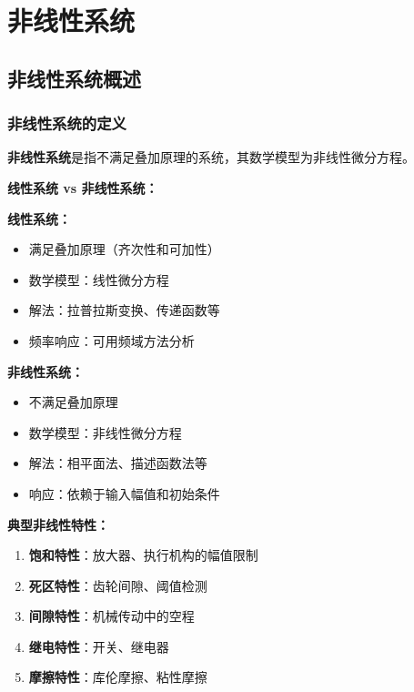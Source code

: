 \section{非线性系统}

\subsection{非线性系统概述}

\subsubsection{非线性系统的定义}

\textbf{非线性系统}是指不满足叠加原理的系统，其数学模型为非线性微分方程。

\begin{minipage}[t]{0.48\textwidth}
\textbf{线性系统 vs 非线性系统：}

\textbf{线性系统：}
\begin{itemize}
    \item 满足叠加原理（齐次性和可加性）
    \item 数学模型：线性微分方程
    \item 解法：拉普拉斯变换、传递函数等
    \item 频率响应：可用频域方法分析
\end{itemize}

\textbf{非线性系统：}
\begin{itemize}
    \item 不满足叠加原理
    \item 数学模型：非线性微分方程
    \item 解法：相平面法、描述函数法等
    \item 响应：依赖于输入幅值和初始条件
\end{itemize}

\vspace{0.3cm}
\textbf{典型非线性特性：}

\begin{enumerate}
    \item \textbf{饱和特性}：放大器、执行机构的幅值限制
    \item \textbf{死区特性}：齿轮间隙、阈值检测
    \item \textbf{间隙特性}：机械传动中的空程
    \item \textbf{继电特性}：开关、继电器
    \item \textbf{摩擦特性}：库伦摩擦、粘性摩擦
\end{enumerate}
\end{minipage}\hfill
